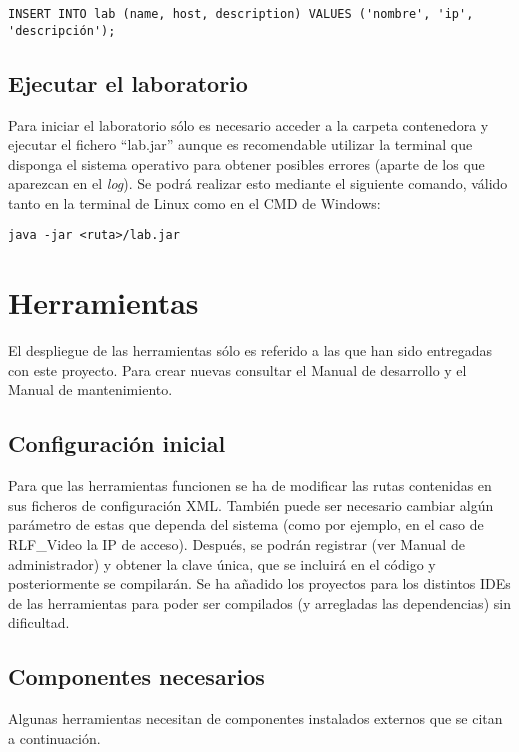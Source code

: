 \begin{verbatim}
INSERT INTO lab (name, host, description) VALUES ('nombre', 'ip', 'descripción');
\end{verbatim}

\subsection*{Ejecutar el laboratorio}
Para iniciar el laboratorio sólo es necesario acceder a la carpeta 
contenedora y ejecutar el fichero ``lab.jar'' aunque es recomendable 
utilizar la terminal que disponga el sistema operativo para obtener 
posibles errores (aparte de los que aparezcan en el \emph{log}). Se 
podrá realizar esto mediante el siguiente comando, válido tanto en la 
terminal de Linux como en el CMD de Windows:

\begin{verbatim}
java -jar <ruta>/lab.jar
\end{verbatim}

\section*{Herramientas}
El despliegue de las herramientas sólo es referido a las que han sido 
entregadas con este proyecto. Para crear nuevas consultar el Manual de 
desarrollo y el Manual de mantenimiento.

\subsection*{Configuración inicial}
Para que las herramientas funcionen se ha de modificar las rutas 
contenidas en sus ficheros de configuración XML. También puede ser 
necesario cambiar algún parámetro de estas que dependa del sistema 
(como por ejemplo, en el caso de RLF\_Video la IP de acceso). Después, 
se podrán registrar (ver Manual de administrador) y obtener la clave 
única, que se incluirá en el código y posteriormente se compilarán. 
Se ha añadido los proyectos para los distintos IDEs de las 
herramientas para poder ser compilados (y arregladas las dependencias) 
sin dificultad.

\subsection*{Componentes necesarios}
Algunas herramientas necesitan de componentes instalados externos que 
se citan a continuación.

